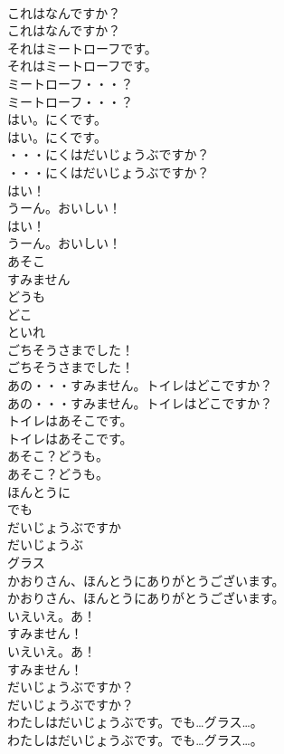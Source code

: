\documentclass[8pt]{extreport}
\begin{document}
\begin{CJK}{UTF8}{min}
\\	これはなんですか？	
\\	これはなんですか？ 
\\	それはミートローフです。	
\\	それはミートローフです。 
\\	ミートローフ・・・？	
\\	ミートローフ・・・？ 
\\	はい。にくです。	
\\	はい。にくです。 
\\	・・・にくはだいじょうぶですか？	
\\	・・・にくはだいじょうぶですか？ 
\\	はい！
\\	うーん。おいしい！	
\\	はい！
\\	うーん。おいしい！ 
\\	あそこ
\\	すみません
\\	どうも
\\	どこ
\\	といれ
\\	ごちそうさまでした！	
\\	ごちそうさまでした！ 
\\	あの・・・すみません。トイレはどこですか？	
\\	あの・・・すみません。トイレはどこですか？ 
\\	トイレはあそこです。	
\\	トイレはあそこです。 
\\	あそこ？どうも。
\\	あそこ？どうも。
\\	ほんとうに
\\	でも
\\	だいじょうぶですか
\\	だいじょうぶ
\\	グラス
\\	かおりさん、ほんとうにありがとうございます。	
\\	かおりさん、ほんとうにありがとうございます。 
\\	いえいえ。あ！
\\	すみません！	
\\	いえいえ。あ！
\\	すみません！ 
\\	だいじょうぶですか？	
\\	だいじょうぶですか？ 
\\	わたしはだいじょうぶです。でも…グラス…。	
\\	わたしはだいじょうぶです。でも…グラス…。 

\end{CJK}
\end{document}
